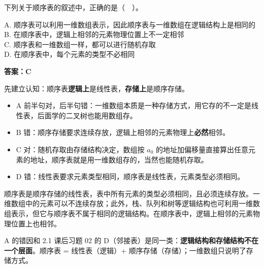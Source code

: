 \documentclass[10.5pt,a4paper,oneside]{article}
\newcommand{\hlred}[1]{\textcolor{wdred}{\bfseries #1}}
\providecommand{\tightlist}{\setlength{\itemsep}{2pt}\setlength{\parskip}{0pt}}
\begin{document}
\begin{questionbox}[02]

下列关于顺序表的叙述中，正确的是（　）。

A.
顺序表可以利用一维数组表示，因此顺序表与一维数组在逻辑结构上是相同的\\
B. 在顺序表中，逻辑上相邻的元素物理位置上不一定相邻\\
C. 顺序表和一维数组一样，都可以进行随机存取\\
D. 在顺序表中，每个元素的类型不必相同

\end{questionbox}

\hlred{\textbf{答案：C}}

\begin{videobox}

先建立认知：顺序表\textbf{逻辑上}是线性表，\textbf{存储上}是顺序存储。

\begin{itemize}
\tightlist
\item
  A
  前半句对，后半句错：一维数组本质是一种存储方式，用它存的不一定是线性表，后面学的二叉树也能用数组存。
\item
  B 错：顺序存储要求连续存放，逻辑上相邻的元素物理上\textbf{必然}相邻。
\item
  C 对：随机存取由存储结构决定，数组按 \(a_0\)
  的地址加偏移量直接算出任意元素的地址，顺序表就是用一维数组存的，当然也能随机存取。
\item
  D 错：线性表要求元素类型相同，顺序表是线性表，元素类型必须相同。
\end{itemize}

\end{videobox}

\begin{jiexibox}

顺序表是顺序存储的线性表，表中所有元素的类型必须相同，且必须连续存放。一维数组中的元素可以不连续存放；此外，栈、队列和树等逻辑结构也可利用一维数组表示，但它与顺序表不属于相同的逻辑结构。在顺序表中，逻辑上相邻的元素物理位置上也相邻。

\end{jiexibox}

\begin{addbox}

A 的错因和 2.1 课后习题 02 的
D（邻接表）是同一类：\textbf{逻辑结构和存储结构不在一个层面}。顺序表 =
线性表（逻辑）+ 顺序存储（存储）；一维数组只说明了存储方式。

\end{addbox}
\end{document}
